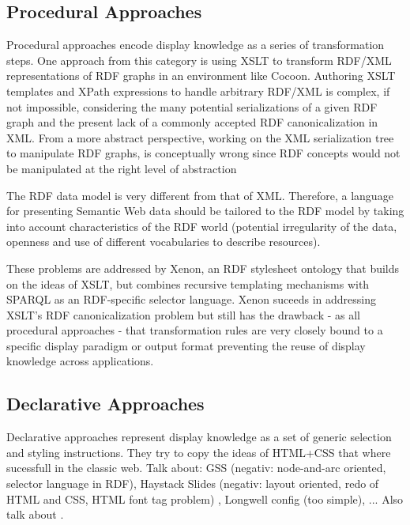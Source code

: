 \subsection{Procedural Approaches}

Procedural approaches encode display knowledge as a series of transformation steps. One approach from this category is using XSLT\cite{xslt04} to transform RDF/XML\cite{rdfxml04} representations of RDF graphs in an environment like Cocoon\cite{cocoon04}. Authoring XSLT templates and XPath expressions to handle arbitrary RDF/XML is complex, if not impossible, considering the many potential serializations of a given RDF graph and the present lack of a commonly accepted RDF canonicalization in XML\cite{Carroll04}. From a more abstract perspective, working on the XML serialization tree to manipulate RDF graphs, is conceptually wrong since RDF concepts would not be manipulated at the right level of abstraction %

The RDF data model is very different from that of XML.  Therefore, a language for presenting Semantic Web data should be tailored to the RDF model by taking into account characteristics of the RDF world (potential irregularity of the data, openness and use of different vocabularies to describe resources).

These problems are addressed by Xenon\cite{quan05}, an RDF stylesheet ontology that builds on the ideas of XSLT, but combines recursive templating mechanisms with SPARQL as an RDF-specific selector language. Xenon suceeds in addressing XSLT's RDF canonicalization problem but still has the drawback - as all procedural approaches - that transformation rules are very closely bound to a specific display paradigm or output format preventing the reuse of display knowledge across applications. 

\subsection{Declarative Approaches}

Declarative approaches represent display knowledge as a set of generic selection and styling instructions. They try to copy the ideas of HTML+CSS that where sucessfull in the classic web. Talk about: GSS \cite{gss03} (negativ: node-and-arc oriented, selector language in RDF), Haystack Slides \cite{HaystackUI03}(negativ: layout oriented, redo of HTML and CSS, HTML font tag problem) , Longwell config (too simple), ... Also talk about \cite{Rutledge05}.
